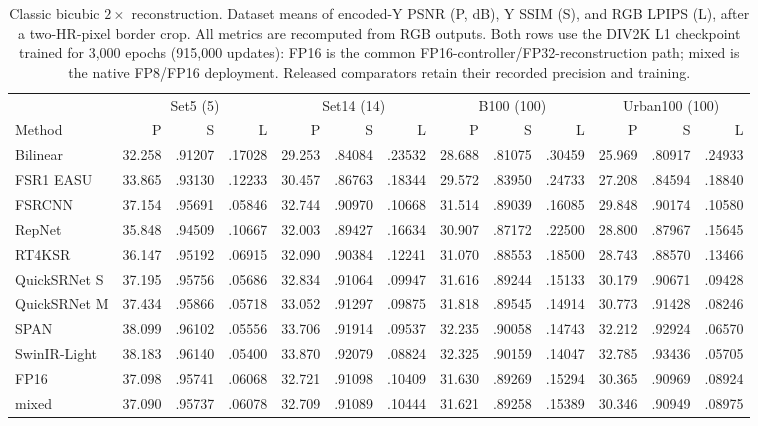 \begin{table}[t]
\centering
\begingroup\fontsize{8}{9.5}\selectfont\setlength{\tabcolsep}{2.5pt}
\caption{Classic bicubic $2\times$ reconstruction. Dataset means of encoded-Y PSNR (P, dB), Y SSIM (S), and RGB LPIPS (L), after a two-HR-pixel border crop. All metrics are recomputed from RGB outputs. Both \model{} rows use the DIV2K L1 checkpoint trained for 3,000 epochs (915,000 updates): FP16 is the common FP16-controller/FP32-reconstruction path; mixed is the native FP8/FP16 deployment. Released comparators retain their recorded precision and training.}
\label{tab:classic-bicubic}
\begin{tabular}{l*{12}{r}}
\toprule
 & \multicolumn{3}{c}{Set5 (5)} & \multicolumn{3}{c}{Set14 (14)} & \multicolumn{3}{c}{B100 (100)} & \multicolumn{3}{c}{Urban100 (100)}\\
Method & P & S & L & P & S & L & P & S & L & P & S & L\\
\midrule
Bilinear &32.258&.91207&.17028&29.253&.84084&.23532&28.688&.81075&.30459&25.969&.80917&.24933\\
FSR1 EASU &33.865&.93130&.12233&30.457&.86763&.18344&29.572&.83950&.24733&27.208&.84594&.18840\\
FSRCNN &37.154&.95691&.05846&32.744&.90970&.10668&31.514&.89039&.16085&29.848&.90174&.10580\\
RepNet &35.848&.94509&.10667&32.003&.89427&.16634&30.907&.87172&.22500&28.800&.87967&.15645\\
RT4KSR &36.147&.95192&.06915&32.090&.90384&.12241&31.070&.88553&.18500&28.743&.88570&.13466\\
QuickSRNet S &37.195&.95756&.05686&32.834&.91064&.09947&31.616&.89244&.15133&30.179&.90671&.09428\\
QuickSRNet M &37.434&.95866&.05718&33.052&.91297&.09875&31.818&.89545&.14914&30.773&.91428&.08246\\
SPAN &38.099&.96102&.05556&33.706&.91914&.09537&32.235&.90058&.14743&32.212&.92924&.06570\\
SwinIR-Light &38.183&.96140&.05400&33.870&.92079&.08824&32.325&.90159&.14047&32.785&.93436&.05705\\
\midrule
\model{} FP16 &37.098&.95741&.06068&32.721&.91098&.10409&31.630&.89269&.15294&30.365&.90969&.08924\\
\model{} mixed &37.090&.95737&.06078&32.709&.91089&.10444&31.621&.89258&.15389&30.346&.90949&.08975\\
\bottomrule
\end{tabular}
\endgroup
\end{table}
